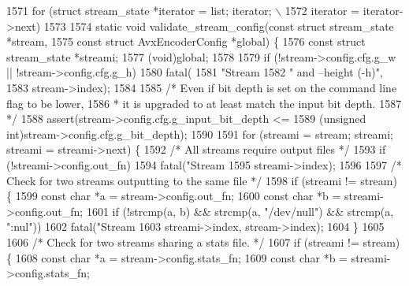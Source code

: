 \begin{DoxyCodeInclude}
{{{{{{{{{{{{{{{{{{{{{1571 \textcolor{preprocessor}{  for (struct stream\_state *iterator = list; iterator; \(\backslash\)}
1572 \textcolor{preprocessor}{       iterator = iterator->next)}
1573 
1574 \textcolor{keyword}{static} \textcolor{keywordtype}{void} validate\_stream\_config(\textcolor{keyword}{const} \textcolor{keyword}{struct} stream\_state *stream,
1575                                    \textcolor{keyword}{const} \textcolor{keyword}{struct} AvxEncoderConfig *global) \{
1576   \textcolor{keyword}{const} \textcolor{keyword}{struct }stream\_state *streami;
1577   (void)global;
1578 
1579   \textcolor{keywordflow}{if} (!stream->config.cfg.g\_w || !stream->config.cfg.g\_h)
1580     fatal(
1581         \textcolor{stringliteral}{"Stream %
1582         \textcolor{stringliteral}{" and --height (-h)"},
1583         stream->index);
1584 
1585   \textcolor{comment}{/* Even if bit depth is set on the command line flag to be lower,}
1586 \textcolor{comment}{   * it is upgraded to at least match the input bit depth.}
1587 \textcolor{comment}{   */}
1588   assert(stream->config.cfg.g\_input\_bit\_depth <=
1589          (\textcolor{keywordtype}{unsigned} \textcolor{keywordtype}{int})stream->config.cfg.g\_bit\_depth);
1590 
1591   \textcolor{keywordflow}{for} (streami = stream; streami; streami = streami->next) \{
1592     \textcolor{comment}{/* All streams require output files */}
1593     \textcolor{keywordflow}{if} (!streami->config.out\_fn)
1594       fatal(\textcolor{stringliteral}{"Stream %
1595             streami->index);
1596 
1597     \textcolor{comment}{/* Check for two streams outputting to the same file */}
1598     \textcolor{keywordflow}{if} (streami != stream) \{
1599       \textcolor{keyword}{const} \textcolor{keywordtype}{char} *a = stream->config.out\_fn;
1600       \textcolor{keyword}{const} \textcolor{keywordtype}{char} *b = streami->config.out\_fn;
1601       \textcolor{keywordflow}{if} (!strcmp(a, b) && strcmp(a, \textcolor{stringliteral}{"/dev/null"}) && strcmp(a, \textcolor{stringliteral}{":nul"}))
1602         fatal(\textcolor{stringliteral}{"Stream %
1603               streami->index, stream->index);
1604     \}
1605 
1606     \textcolor{comment}{/* Check for two streams sharing a stats file. */}
1607     \textcolor{keywordflow}{if} (streami != stream) \{
1608       \textcolor{keyword}{const} \textcolor{keywordtype}{char} *a = stream->config.stats\_fn;
1609       \textcolor{keyword}{const} \textcolor{keywordtype}{char} *b = streami->config.stats\_fn;
}}}}}}}}}}}}}}}}}}}}}}}}
\end{DoxyCodeInclude}
